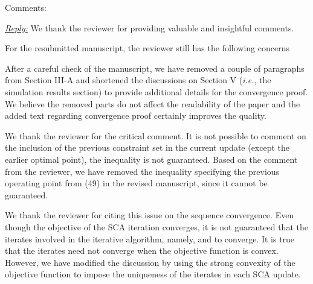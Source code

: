 Comments:

\vspace{1eM}
\underline{\textit{Reply:}} We thank the reviewer for providing valuable and insightful comments.

\vspace{1eM}
For the resubmitted manuscript, the reviewer still has the following concerns

\begin{enumerate}
 

\resp After a careful check of the manuscript, we have removed a couple of paragraphs from Section III-A and shortened the discussions on Section V (\textit{i.e.}, the simulation results section) to provide additional details for the convergence proof. We believe the removed parts do not affect the readability of the paper and the added text regarding convergence proof certainly improves the quality. 

 

\resp We thank the reviewer for the critical comment. It is not possible to comment on the inclusion of the previous constraint set in the current update (except the earlier optimal point), the inequality is not guaranteed. Based on the comment from the reviewer, we have removed the inequality specifying the previous operating point from (49) in the revised manuscript, since it cannot be guaranteed. 

 

\resp  We thank the reviewer for citing this issue on the sequence convergence. Even though the objective of the \ac{SCA} iteration converges, it is not guaranteed that the iterates involved in the iterative algorithm, namely,  and  to converge. It is true that the iterates need not converge when the objective function is convex. However, we have modified the discussion by using the strong convexity of the objective function to impose the uniqueness of the iterates in each \ac{SCA} update. 


\end{enumerate}
